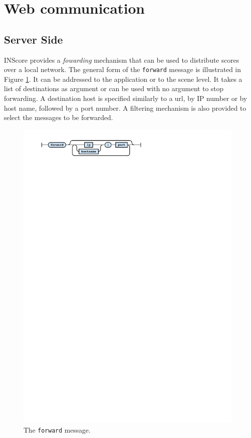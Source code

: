 \documentclass{article}
\newcommand{\icode}[1]	{{\small \texttt{#1}}}
\begin{document}
\section{Web communication}\label{sec:comm}

\subsection{Server Side}\label{sec:server}
INScore provides a \emph{fowarding} mechanism \cite{Fober:15b} that can be used to distribute scores over a local network.
The general form of the \icode{forward} message is illustrated in Figure \ref{fig:forward}. It can be addressed to the application or to the scene level. It takes a list of destinations as argument or can be used with no argument to stop forwarding. A destination host is specified similarly to a url, by IP number or by host name, followed by a port number.
A filtering mechanism is also provided to select the messages to be forwarded.
\begin{figure}[h]
\centering
\includegraphics[width=0.75\columnwidth]{rsrc/faust3.pdf}
\caption{The \icode{forward} message.}
\label{fig:forward}
\end{figure}
\end{document}
